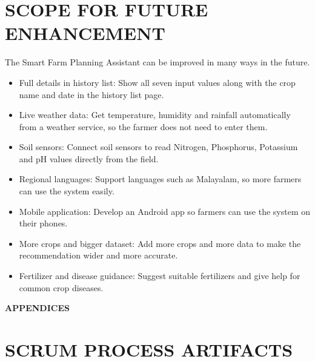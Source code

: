 \chapter{SCOPE FOR FUTURE ENHANCEMENT}
The Smart Farm Planning Assistant can be improved in many ways in the future.
\begin{itemize}
\item Full details in history list: Show all seven input values along with the crop name and date in the history list page.
\item Live weather data: Get temperature, humidity and rainfall automatically from a weather service, so the farmer does not need to enter them.
\item Soil sensors: Connect soil sensors to read Nitrogen, Phosphorus, Potassium and pH values directly from the field.
\item Regional languages: Support languages such as Malayalam, so more farmers can use the system easily.
\item Mobile application: Develop an Android app so farmers can use the system on their phones.
\item More crops and bigger dataset: Add more crops and more data to make the recommendation wider and more accurate.
\item Fertilizer and disease guidance: Suggest suitable fertilizers and give help for common crop diseases.
\end{itemize}
%
%
%
%
\clearpage
{}
\appendix
\quad\vfill
\begin{center}
{\Huge \bf APPENDICES}
\end{center}
\vfill
\clearpage
%
%
%
%
\chapter{SCRUM PROCESS ARTIFACTS}
%
